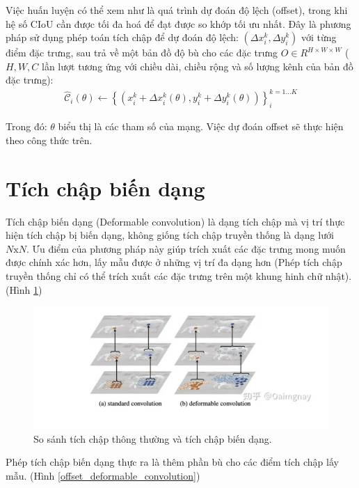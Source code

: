 \documentclass[12pt,a4paper,openany,oneside]{report}
\begin{document}
Việc huấn luyện có thể xem như là quá trình dự đoán độ lệch (offset), trong khi hệ số CIoU cần được tối đa hoá để đạt được so khớp tối ưu nhất. Đây là phương pháp sử dụng phép toán tích chập để dự đoán độ lệch:
$\left(\Delta x_i^k, \Delta y_i^k\right)$
với từng điểm đặc trưng, sau trả về một bản đồ độ bù cho các đặc trưng
$O \in R^{H \times W \times W}$ ($H, W, C$ lần lượt tương ứng với chiều dài, chiều rộng và số lượng kênh của bản đồ đặc trưng):
\begin{align} \label{convex_hull_learn_offset}
	\hat{\mathcal{C}}_i(\theta) \leftarrow\left\{\left(x_i^k+\Delta x_i^k(\theta), y_i^k+\Delta y_i^k(\theta)\right)\right\}_i^{k=1 \ldots K}
\end{align}

Trong đó: $\theta$ biểu thị là các tham số của mạng. Việc dự đoán offset sẽ thực hiện theo công thức trên.

\section{Tích chập biến dạng}
Tích chập biến dạng (Deformable convolution) là dạng tích chập mà vị trí thực hiện tích chập bị biến dạng, không giống tích chập truyền thống là dạng lưới $N\mathrm{x}N$. Ưu điểm của phương pháp này giúp trích xuất các đặc trưng mong muốn được chính xác hơn, lấy mẫu được ở những vị trí đa dạng hơn (Phép tích chập truyền thống chỉ có thể trích xuất các đặc trưng trên một khung hinh chữ nhật).(Hình \ref{so_sanh_tich_chap_thong_thuong_deformable})

\begin{figure}[ht!]
	\begin{center}
		\includegraphics[width=445px]{./compare_normal_with_deformable_convolution.jpg}
		\caption{So sánh tích chập thông thường và tích chập biến dạng.}
		\label{so_sanh_tich_chap_thong_thuong_deformable}
	\end{center}
\end{figure} 

Phép tích chập biến dạng thực ra là thêm phần bù cho các điểm tích chập lấy mẫu. (Hình \ref{offset_deformable_convolution})
\end{document}

